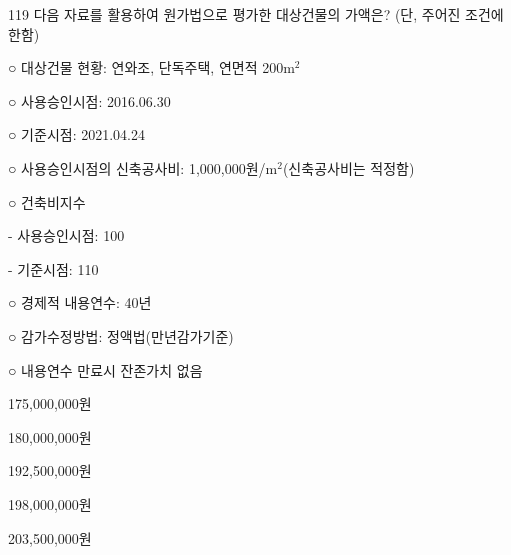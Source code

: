 \begin{question}{119}
다음 자료를 활용하여 원가법으로 평가한 대상건물의 가액은? (단, 주어진 조건에 한함)
\begin{framedtext}
○ 대상건물 현황: 연와조, 단독주택, 연면적 200m$^2$ \par
○ 사용승인시점: 2016.06.30 \par
○ 기준시점: 2021.04.24 \par
○ 사용승인시점의 신축공사비: 1,000,000원/m$^2$(신축공사비는 적정함) \par
○ 건축비지수 \par
\hspace*{1em}- 사용승인시점: 100 \par
\hspace*{1em}- 기준시점: 110 \par
○ 경제적 내용연수: 40년 \par
○ 감가수정방법: 정액법(만년감가기준) \par
○ 내용연수 만료시 잔존가치 없음 \par
\end{framedtext}
\begin{choices}
  \item 175,000,000원
  \item 180,000,000원
  \item 192,500,000원
  \item 198,000,000원
  \item 203,500,000원
\end{choices}
\end{question}
